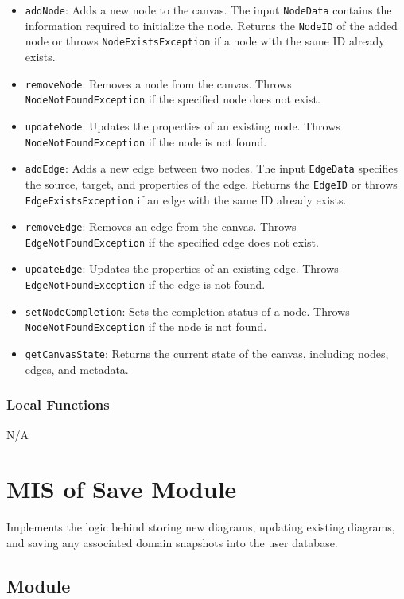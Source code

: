 \documentclass[12pt, titlepage]{article}
\begin{document}
\begin{itemize} 
\item \texttt{addNode}: Adds a new node to the canvas. The input
\texttt{NodeData} contains the information required to initialize the node. Returns the \texttt{NodeID} of the added node or throws 
\texttt{NodeExistsException} if a node with the same ID already exists. 
\item \texttt{removeNode}: Removes a node from the canvas. Throws 
\texttt{NodeNotFoundException} if the specified node does not exist. 
\item \texttt{updateNode}: Updates the properties of an existing node. Throws \texttt{NodeNotFoundException} if the node is not found. 
\item \texttt{addEdge}: Adds a new edge between two nodes. The input 
\texttt{EdgeData} specifies the source, target, and properties of the edge. Returns the \texttt{EdgeID} or throws
\texttt{EdgeExistsException} if an edge with the same ID already exists. 
\item \texttt{removeEdge}: Removes an edge from the canvas. Throws \texttt{EdgeNotFoundException} if the specified edge does not exist. 
\item \texttt{updateEdge}: Updates the properties of an existing edge. Throws \texttt{EdgeNotFoundException} if the edge is not found.
\item \texttt{setNodeCompletion}: Sets the completion status of a node. Throws \texttt{NodeNotFoundException} if the node is not found. 
\item \texttt{getCanvasState}: Returns the current state of the canvas, including nodes, edges, and metadata. \end{itemize} 

\subsubsection{Local Functions}

N/A

\newpage

\section{MIS of Save Module} \label{mSaveMIS} 
Implements the logic behind storing new diagrams, updating existing diagrams, and saving any associated domain snapshots into the user database.

\subsection{Module}
\end{document}
